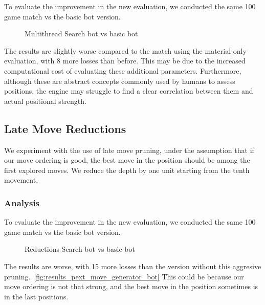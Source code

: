 To evaluate the improvement in the new evaluation, we conducted the same 100 game match vs the basic bot version. 

\begin{center}
    \begin{figure}[H]
        \centering
        \caption{Multithread Search bot vs basic bot}
        \label{fig:results_multithread_search_bot}
    \end{figure}
\medskip
\end{center}

\noindent The results are slightly worse compared to the match using the material-only evaluation, with 8 more losses than before. This may be due to the increased computational cost of evaluating these additional parameters. Furthermore, although these are abstract concepts commonly used by humans to assess positions, the engine may struggle to find a clear correlation between them and actual positional strength.

\subsection{Late Move Reductions}

We experiment with the use of late move pruning, under the assumption that if our move ordering is good, the best move in the position should be among the first explored moves. We reduce the depth by one unit starting from the tenth movement.

\subsubsection{Analysis}

To evaluate the improvement in the new evaluation, we conducted the same 100 game match vs the basic bot version.

\begin{center}
    \begin{figure}[H]
        \centering
        \caption{Reductions Search bot vs basic bot}
        \label{fig:results_reductions_search_bot}
    \end{figure}
\medskip
\end{center}

\noindent The results are worse, with 15 more losses than the version without this aggresive pruning.~\ref{fig:results_pext_move_generator_bot} This could be because our move ordering is not that strong, and the best move in the position sometimes is in the last positions.


